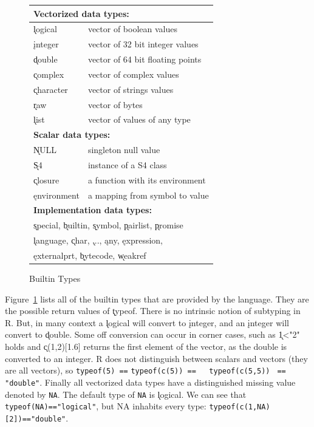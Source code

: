 \documentclass[acmsmall,10pt,review,anonymous]{acmart}\settopmatter{printfolios=true,printccs=false,printacmref=false}
\newcommand{\code}[1]{\lstinline|#1|\xspace}
\begin{document}
\begin{figure}
\footnotesize\begin{tabular}{l|l@{}}\hline
\multicolumn{2}{l}{\bf Vectorized data types:}  \\\hline
\k{logical}  & vector of boolean values\\
\k{integer}   & vector of 32 bit integer values\\
\k{double} & vector of 64 bit floating points\\
\k{complex} & vector of complex values\\
\k{character} & vector of strings values\\
\k{raw} & vector of bytes\\
\k{list} & vector of values of any type\\\hline
\multicolumn{2}{l}{\bf Scalar data types:}\\\hline
\k{NULL}  &  singleton null value\\
\k{S4}    &  instance of a S4 class \\
\k{closure} & a function with its environment\\
\k{environment} & a mapping from symbol to value \\\hline
\multicolumn{2}{l}{\bf Implementation data types:}\\\hline
\multicolumn{2}{l}{\k{special},
\k{builtin},
\k{symbol},
\k{pairlist},
\k{promise}}\\
\multicolumn{2}{l}{
\k{language},
\k{char},
\k{...}, 
\k{any},
\k{expression},
}\\
\multicolumn{2}{l}{
\k{externalprt},
\k{bytecode},
\k{weakref}}\\\hline
\end{tabular}\caption{Builtin Types}\label{types}\end{figure}

Figure~\ref{types} lists all of the builtin types that are provided by the
language. They are the possible return values of \k{typeof}. There is no
intrinsic notion of subtyping in R. But, in many context a \k{logical} will
convert to \k{integer}, and an \k{integer} will convert to \k{double}.  Some
off conversion can occur in corner cases, such as \k{1<"2"} holds and
\k{c(1,2)[1.6]} returns the first element of the vector, as the double is
converted to an integer. R does not distinguish between scalars and vectors
(they are all vectors), so \code{typeof(5) ==} \code{typeof(c(5)) ==
  typeof(c(5,5))} \code{ == "double"}. Finally all vectorized data types have a
distinguished missing value denoted by \code{NA}. The default type of
\code{NA} is \k{logical}. We can see that \code{typeof(NA)=="logical"}, but
NA inhabits every type: \code{typeof(c(1,NA)[2])=="double"}.
\end{document}
